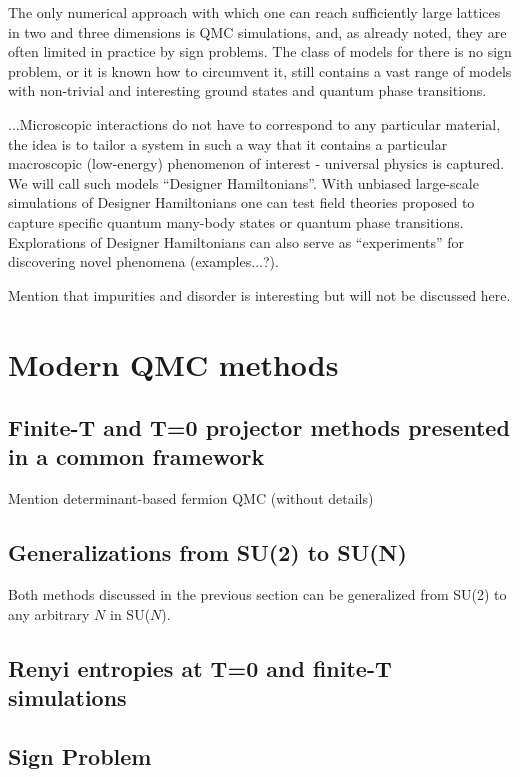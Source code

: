 \documentclass[aps,prb,groupedaddress,twocolumn]{revtex4}
\begin{document}
The only numerical approach with which one can reach sufficiently large lattices in two and three dimensions
is QMC simulations, and, as already noted, they are often limited in practice by sign problems. The class of
models for there is no sign problem, or it is known how to circumvent it, still contains a vast range of 
models with non-trivial and interesting ground states and quantum phase transitions.

...Microscopic interactions do not have to correspond to any particular 
material, the idea is to tailor a system in such a way that it contains a particular macroscopic (low-energy) 
phenomenon of interest - universal physics is captured. We will call such models ``Designer Hamiltonians''.
With unbiased large-scale simulations of Designer Hamiltonians one can test field theories proposed to 
capture specific quantum many-body states or quantum phase transitions. Explorations of Designer Hamiltonians
can also serve as ``experiments'' for discovering novel phenomena (examples...?).


Mention that impurities and disorder is interesting but will not be discussed here.

\section{Modern QMC methods}




\subsection{Finite-T and T=0 projector methods presented in a common
  framework}
\label{ss:method}

Mention determinant-based fermion QMC (without details)

\subsection {Generalizations from SU(2) to SU(N)}
\label{ss:su2N}

Both methods discussed in the previous section can be generalized from
SU(2) to any arbitrary $N$ in SU($N$). 

\subsection{Renyi entropies at T=0 and finite-T simulations}

\subsection{Sign Problem}
\label{ss:sign}
\end{document}
